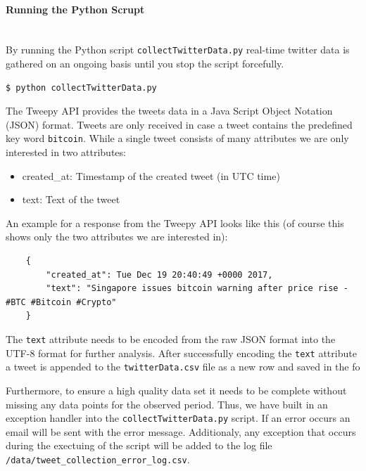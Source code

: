 \documentclass[a4paper,12pt]{article}
\begin{document}
\begin{spacing}{1.2}
\paragraph{Running the Python Scrupt}\mbox{}\\{}
By running the Python script \verb|collectTwitterData.py| real-time twitter data is gathered on an ongoing basis until you stop the script forcefully.
\begin{lstlisting}[language=bash]
    $ python collectTwitterData.py
    \end{lstlisting}

The Tweepy API provides the tweets data in a Java Script Object Notation (JSON) format. Tweets are only received in case a tweet contains the predefined key word \verb|bitcoin|. While a single tweet consists of many attributes we are only interested in two attributes:
\begin{itemize}
    \item created\_at: Timestamp of the created tweet (in UTC time)
    \item text: Text of the tweet
\end{itemize}

An example for a response from the Tweepy API looks like this (of course this shows only the two attributes we are interested in):
\begin{lstlisting}
    {
        "created_at": Tue Dec 19 20:40:49 +0000 2017, 
        "text": "Singapore issues bitcoin warning after price rise - #BTC #Bitcoin #Crypto"
    }
\end{lstlisting}

The \verb|text| attribute needs to be encoded from the raw JSON format into the UTF-8 format for further analysis. After successfully encoding the \verb|text| attribute a tweet is appended to the \verb|twitterData.csv| file as a new row and saved in the fo

Furthermore, to ensure a high quality data set it needs to be complete without missing any data points for the observed period. Thus, we have built in an exception handler into the \verb|collectTwitterData.py| script. If an error occurs an email will be sent with the error message. Additionaly, any exception that occurs during the exectuing of the script will be added to the log file \verb|/data/tweet_collection_error_log.csv|.


\end{spacing}
\end{document}
